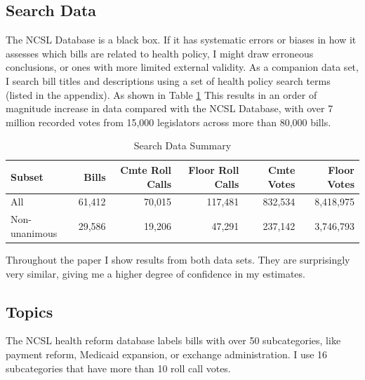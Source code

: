 \documentclass[
  oneside]{book}
\begin{document}
\hypertarget{search-data}{%
\subsection{Search Data}\label{search-data}}

The NCSL Database is a black box. If it has systematic errors or biases in how it assesses which bills are related to health policy, I might draw erroneous conclusions, or ones with more limited external validity. As a companion data set, I search bill titles and descriptions using a set of health policy search terms (listed in the appendix). As shown in Table \ref{tab:search-summary} This results in an order of magnitude increase in data compared with the NCSL Database, with over 7 million recorded votes from 15,000 legislators across more than 80,000 bills.

\begin{table}

\caption{\label{tab:search-summary}Search Data Summary}
\centering
\begin{tabular}[t]{lrrrrr}
\toprule
Subset & Bills & Cmte Roll Calls & Floor Roll Calls & Cmte Votes & Floor Votes\\
\midrule
All & 61,412 & 70,015 & 117,481 & 832,534 & 8,418,975\\
Non-unanimous & 29,586 & 19,206 & 47,291 & 237,142 & 3,746,793\\
\bottomrule
\end{tabular}
\end{table}

Throughout the paper I show results from both data sets. They are surprisingly very similar, giving me a higher degree of confidence in my estimates.

\hypertarget{topics}{%
\subsection{Topics}\label{topics}}

The NCSL health reform database labels bills with over 50 subcategories, like payment reform, Medicaid expansion, or exchange administration. I use 16 subcategories that have more than 10 roll call votes.
\end{document}

